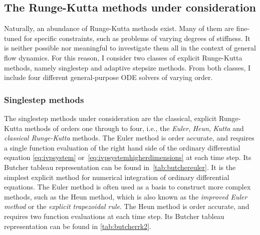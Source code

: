 \clearpage

\subsection{The Runge-Kutta methods under consideration}
\label{sub:the_runge_kutta_methods_under_consideration}

Naturally, an abundance of Runge-Kutta methods exist. Many of them are
fine-tuned for specific constraints, such as problems of varying degrees of
stiffness. It is neither possible nor meaningful to investigate them all
in the context of general flow dynamics. For this reason, I consider two classes
of explicit Runge-Kutta methods, namely singlestep and adaptive stepsize
methods. From both classes, I include four different general-purpose ODE solvers
of varying order.

\subsubsection{Singlestep methods}
\label{ssub:singlestep_methods}

The singlestep methods under consideration are the classical, explicit
Runge-Kutta methods of orders one through to four, i.e., the \emph{Euler},
\emph{Heun}, \emph{Kutta} and \emph{classical Runge-Kutta} methods. The
Euler method is  order accurate, and requires a single function
evaluation of the right hand side of the ordinary differential equation
\eqref{eq:ivpsystem} or~\eqref{eq:ivpsystemhigherdimensions} at each time step.
Its Butcher tableau representation can be found in~\cref{tab:butchereuler}.
It is the simplest explicit method for numerical integration of ordinary
differential equations. The Euler method is often used as a basis to construct
more complex methods, such as the Heun method, which is also known as the
\emph{improved Euler method} or the \emph{explicit trapezoidal rule}. The Heun
method is  order accurate, and requires two function evaluations at each
time step. Its Butcher tableau representation can be found in
\cref{tab:butcherrk2}.






